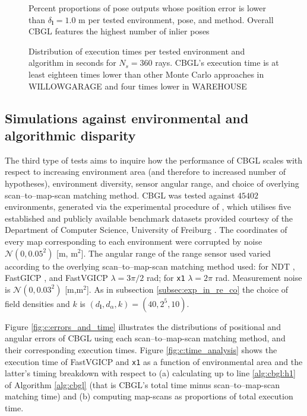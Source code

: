 \begin{figure}
  
  \caption{\small Percent proportions of pose outputs whose position error is
           lower than $\delta_{\bm{l}} = 1.0$ m per tested environment, pose,
           and method. Overall CBGL features the highest number of inlier poses}
  \label{fig:b:inliers_per_pose}
\end{figure}

\begin{figure}
  
  \vspace{0.1cm}
  \caption{\small Distribution of execution times per tested environment and
           algorithm in seconds for $N_s = 360$ rays. CBGL's execution time is
           at least eighteen times lower than other Monte Carlo approaches in
           WILLOWGARAGE and four times lower in WAREHOUSE}
  \label{fig:b:execution_times}
\end{figure}


\subsection{Simulations against environmental and algorithmic disparity }

The third type of tests aims to inquire how the performance of CBGL scales with
respect to increasing environment area (and therefore to increased number of
hypotheses), environment diversity, sensor angular range, and choice of
overlying scan--to--map-scan matching method. CBGL was tested against $45402$
environments, generated via the experimental procedure of
\cite{Filotheou2023a}, which utilises five established and publicly available
benchmark datasets provided courtesy of the Department of Computer Science,
University of Freiburg \cite{datasets_link}.  The coordinates of every map
corresponding to each environment were corrupted by noise
$\mathcal{N}(0,0.05^2)$ [m, m$^2$]. The angular range of the range sensor used
varied according to the overlying scan--to--map-scan matching method used: for
NDT \cite{ndt}, FastGICP \cite{fgi}, and FastVGICP \cite{fvg} $\lambda =
3\pi/2$ rad; for \texttt{x1} $\lambda = 2\pi$ rad. Measurement noise is
$\mathcal{N}(0,0.03^2)$ [m,m$^2$]. As in subsection \ref{subsec:exp_in_re_co}
the choice of field densities and $k$ is $(d_{\bm{l}},d_{\alpha},k) = (40, 2^5,
10)$.

Figure \ref{fig:c:errors_and_time} illustrates the distributions of positional
and angular errors of CBGL using each scan--to--map-scan matching method, and
their corresponding execution times. Figure \ref{fig:c:time_analysis} shows the
execution time of FastVGICP and \texttt{x1} as a function of environmental area
and the latter's timing breakdown with respect to (a) calculating up to line
\ref{alg:cbgl:h1} of Algorithm \ref{alg:cbgl} (that is CBGL's total time minus
scan--to--map-scan matching time) and (b) computing map-scans as proportions of
total execution time.

